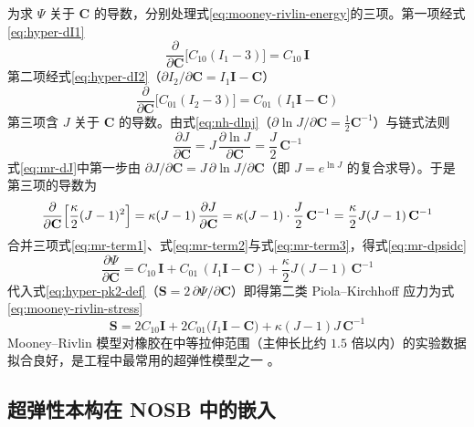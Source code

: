 为求 $\Psi$ 关于 $\mathbf{C}$ 的导数，分别处理式\eqref{eq:mooney-rivlin-energy}的三项。第一项经式\eqref{eq:hyper-dI1}
\begin{equation}
  \frac{\partial}{\partial\mathbf{C}}\bigl[C_{10}(I_1-3)\bigr]=C_{10}\,\mathbf{I}
  \label{eq:mr-term1}
\end{equation}
第二项经式\eqref{eq:hyper-dI2}（$\partial I_2/\partial\mathbf{C}=I_1\mathbf{I}-\mathbf{C}$）
\begin{equation}
  \frac{\partial}{\partial\mathbf{C}}\bigl[C_{01}(I_2-3)\bigr]=C_{01}\,(I_1\mathbf{I}-\mathbf{C})
  \label{eq:mr-term2}
\end{equation}
第三项含 $J$ 关于 $\mathbf{C}$ 的导数。由式\eqref{eq:nh-dlnj}（$\partial\ln J/\partial\mathbf{C}=\tfrac{1}{2}\mathbf{C}^{-1}$）与链式法则
\begin{equation}
  \frac{\partial J}{\partial\mathbf{C}}=J\,\frac{\partial\ln J}{\partial\mathbf{C}}
  =\frac{J}{2}\,\mathbf{C}^{-1}
  \label{eq:mr-dJ}
\end{equation}
式\eqref{eq:mr-dJ}中第一步由 $\partial J/\partial\mathbf{C}=J\,\partial\ln J/\partial\mathbf{C}$（即 $J=e^{\ln J}$ 的复合求导）。于是第三项的导数为
\begin{equation}
  \frac{\partial}{\partial\mathbf{C}}\Bigl[\frac{\kappa}{2}(J-1)^{2}\Bigr]
  =\kappa(J-1)\,\frac{\partial J}{\partial\mathbf{C}}
  =\kappa(J-1)\cdot\frac{J}{2}\,\mathbf{C}^{-1}
  =\frac{\kappa}{2}J(J-1)\,\mathbf{C}^{-1}
  \label{eq:mr-term3}
\end{equation}
合并三项式\eqref{eq:mr-term1}、式\eqref{eq:mr-term2}与式\eqref{eq:mr-term3}，得式\eqref{eq:mr-dpsidc}
\begin{equation}
  \frac{\partial\Psi}{\partial\mathbf{C}}
  =C_{10}\,\mathbf{I}+C_{01}\,(I_1\mathbf{I}-\mathbf{C})+\frac{\kappa}{2}J(J-1)\,\mathbf{C}^{-1}
  \label{eq:mr-dpsidc}
\end{equation}
代入式\eqref{eq:hyper-pk2-def}（$\mathbf{S}=2\,\partial\Psi/\partial\mathbf{C}$）即得第二类 Piola--Kirchhoff 应力为式\eqref{eq:mooney-rivlin-stress}
\begin{equation}
  \mathbf{S}=2C_{10}\mathbf{I}+2C_{01}\bigl(I_1\mathbf{I}-\mathbf{C}\bigr)
  +\kappa(J-1)J\,\mathbf{C}^{-1}
  \label{eq:mooney-rivlin-stress}
\end{equation}
Mooney--Rivlin 模型对橡胶在中等拉伸范围（主伸长比约 $1.5$ 倍以内）的实验数据拟合良好，是工程中最常用的超弹性模型之一 \cite{Mooney1940,Rivlin1948,Ogden1972}。

\subsection{超弹性本构在 NOSB 中的嵌入}\label{sec:hyper-nosb}

